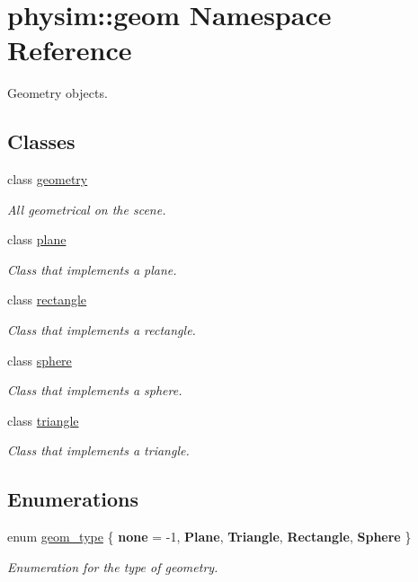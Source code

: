 \hypertarget{namespacephysim_1_1geom}{}\section{physim\+:\+:geom Namespace Reference}
\label{namespacephysim_1_1geom}


Geometry objects.  


\subsection*{Classes}
\begin{DoxyCompactItemize}
\item 
class \hyperlink{classphysim_1_1geom_1_1geometry}{geometry}
\begin{DoxyCompactList}\small\item\em All geometrical on the scene. \end{DoxyCompactList}\item 
class \hyperlink{classphysim_1_1geom_1_1plane}{plane}
\begin{DoxyCompactList}\small\item\em Class that implements a plane. \end{DoxyCompactList}\item 
class \hyperlink{classphysim_1_1geom_1_1rectangle}{rectangle}
\begin{DoxyCompactList}\small\item\em Class that implements a rectangle. \end{DoxyCompactList}\item 
class \hyperlink{classphysim_1_1geom_1_1sphere}{sphere}
\begin{DoxyCompactList}\small\item\em Class that implements a sphere. \end{DoxyCompactList}\item 
class \hyperlink{classphysim_1_1geom_1_1triangle}{triangle}
\begin{DoxyCompactList}\small\item\em Class that implements a triangle. \end{DoxyCompactList}\end{DoxyCompactItemize}
\subsection*{Enumerations}
\begin{DoxyCompactItemize}
\item 
\mbox{\label{namespacephysim_1_1geom_a473d69ab4667a730784b37b67fa4b658}} 
enum \hyperlink{namespacephysim_1_1geom_a473d69ab4667a730784b37b67fa4b658}{geom\+\_\+type} \{ \newline
{\bfseries none} = -\/1, 
{\bfseries Plane}, 
{\bfseries Triangle}, 
{\bfseries Rectangle}, 
\newline
{\bfseries Sphere}
 \}\begin{DoxyCompactList}\small\item\em Enumeration for the type of geometry. \end{DoxyCompactList}
\end{DoxyCompactItemize}


